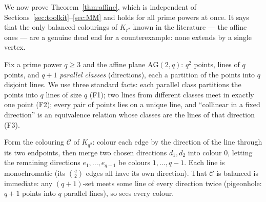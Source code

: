 \documentclass[11pt,reqno]{amsart}
\theoremstyle{definition}
\theoremstyle{remark}
\begin{document}
We now prove Theorem~\ref{thm:affine}, which is independent of
Sections~\ref{sec:toolkit}--\ref{sec:MM} and holds for all prime powers at once. It
says that the only balanced colourings of $K_{r^2}$ known in the literature ---
the affine ones --- are a genuine dead end for a counterexample: none extends by a
single vertex.

Fix a prime power $q\ge 3$ and the affine plane $\mathrm{AG}(2,q)$: $q^2$ points,
lines of $q$ points, and $q+1$ \emph{parallel classes} (directions), each a
partition of the points into $q$ disjoint lines. We use three standard facts:
each parallel class partitions the points into $q$ lines of size $q$ (F1); two lines
from different classes meet in exactly one point (F2); every pair of points lies on a
unique line, and ``collinear in a fixed direction'' is an equivalence relation whose
classes are the lines of that direction (F3).

Form the colouring $\mathcal C$ of $K_{q^2}$: colour each edge by the direction of
the line through its two endpoints, then merge two chosen directions $d_1,d_2$ into
colour $0$, letting the remaining directions $e_1,\dots,e_{q-1}$ be colours
$1,\dots,q-1$. Each line is monochromatic (its $\binom q2$ edges all have its own
direction). That $\mathcal C$ is balanced is immediate: any $(q+1)$-set meets some
line of every direction twice (pigeonhole: $q+1$ points into $q$ parallel lines), so
sees every colour.
\end{document}
